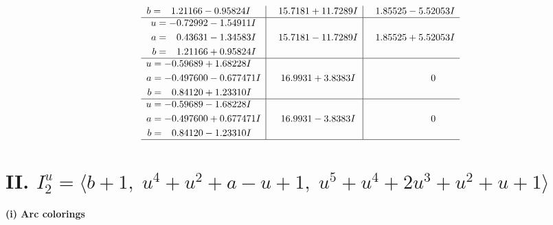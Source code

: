 \documentclass[1p]{elsarticle_modified}
\theoremstyle{definition}
\begin{document}
$$\begin{array}{c|c|c}
\begin{aligned}
b &= \phantom{-}1.21166 - 0.95824 I\end{aligned}
 & \phantom{-}15.7181 + 11.7289 I & \phantom{-}1.85525 - 5.52053 I \\ \hline\begin{aligned}
u &= -0.72992 - 1.54911 I \\
a &= \phantom{-}0.43631 - 1.34583 I \\
b &= \phantom{-}1.21166 + 0.95824 I\end{aligned}
 & \phantom{-}15.7181 - 11.7289 I & \phantom{-}1.85525 + 5.52053 I \\ \hline\begin{aligned}
u &= -0.59689 + 1.68228 I \\
a &= -0.497600 - 0.677471 I \\
b &= \phantom{-}0.84120 + 1.23310 I\end{aligned}
 & \phantom{-}16.9931 + 3.8383 I & \phantom{-0.000000 } 0 \\ \hline\begin{aligned}
u &= -0.59689 - 1.68228 I \\
a &= -0.497600 + 0.677471 I \\
b &= \phantom{-}0.84120 - 1.23310 I\end{aligned}
 & \phantom{-}16.9931 - 3.8383 I & \phantom{-0.000000 } 0\\
 \hline 
 \end{array}$$\newpage\newpage\renewcommand{\arraystretch}{1}
\centering \section*{II. $I^u_{2}= \langle b+1,\;u^4+u^2+a- u+1,\;u^5+u^4+2 u^3+u^2+u+1 \rangle$}
\flushleft \textbf{(i) Arc colorings}\\
\end{document}
